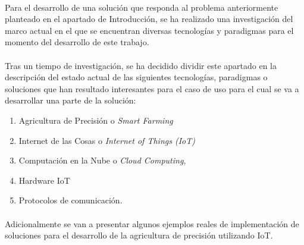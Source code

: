 \documentclass[../../memoria.tex]{subfiles}
\begin{document}
\paragraph{}
Para el desarrollo de una solución que responda al problema anteriormente planteado en el apartado de Introducción, se ha realizado una investigación del marco actual en el que se encuentran diversas tecnologías y paradigmas para el momento del desarrollo de este trabajo.

\paragraph{}
Tras un tiempo de investigación, se ha decidido dividir este apartado en la descripción del estado actual de las siguientes tecnologías, paradigmas o soluciones que han resultado interesantes para el caso de uso para el cual se va a desarrollar una parte de la solución:

\begin{enumerate}
    \item Agricultura de Precisión o \textit{Smart Farming}
    \item Internet de las Cosas o \textit{Internet of Things (IoT)}
    \item Computación en la Nube o \textit{Cloud Computing},
    \item Hardware IoT
    \item Protocolos de comunicación.
\end{enumerate}

\paragraph{}
Adicionalmente se van a presentar algunos ejemplos reales de implementación de soluciones para el desarrollo de la agricultura de precisión utilizando IoT.
\end{document}
